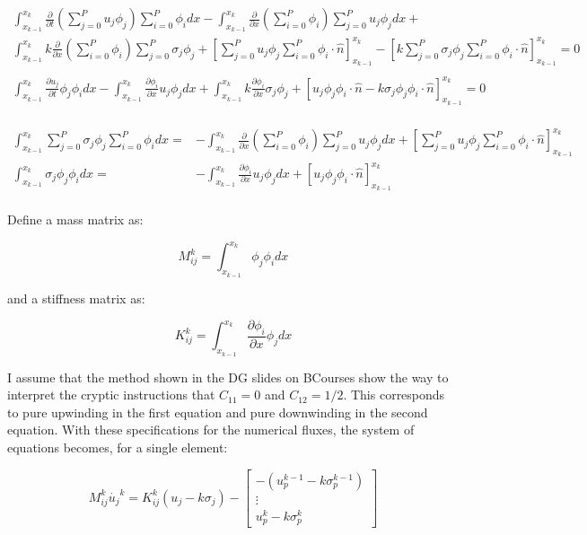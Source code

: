 \documentclass[10pt]{article}
\newcommand{\beq}{\begin{equation}}
\newcommand{\eeq}{\end{equation}}
\newcommand{\beqa}{\begin{equation}\begin{aligned}}
\newcommand{\eeqa}{\end{aligned}\end{equation}}
\begin{document}
\beqa
\int_{x_{k-1}}^{x_k}\frac{\partial}{\partial t}\left(\sum_{j=0}^{P}u_j\phi_j\right)\sum_{i=0}^{P}\phi_idx-\int_{x_{k-1}}^{x_k}\frac{\partial}{\partial x}\left(\sum_{i=0}^{P}\phi_i\right)\sum_{j=0}^{P}u_j\phi_jdx+\quad\\
\int_{x_{k-1}}^{x_k}k\frac{\partial}{\partial x}\left(\sum_{i=0}^{P}\phi_i\right)\sum_{j=0}^{P}\sigma_j\phi_j+\left\lbrack \sum_{j=0}^{P}u_j\phi_j\sum_{i=0}^{P}\phi_i\cdot\hat{n}\right\rbrack_{x_{k-1}}^{x_k}-\left\lbrack k\sum_{j=0}^{P}\sigma_j\phi_j\sum_{i=0}^{P}\phi_i\cdot\hat{n}\right\rbrack_{x_{k-1}}^{x_k}=0\\
\\
\int_{x_{k-1}}^{x_k}\frac{\partial u_j}{\partial t}\phi_j\phi_idx-\int_{x_{k-1}}^{x_k}\frac{\partial\phi_i}{\partial x}u_j\phi_jdx+\int_{x_{k-1}}^{x_k}k\frac{\partial\phi_i}{\partial x}\sigma_j\phi_j+\left\lbrack u_j\phi_j\phi_i\cdot\hat{n}-k\sigma_j\phi_j\phi_i\cdot\hat{n}\right\rbrack_{x_{k-1}}^{x_k}=0\\
\eeqa

\beqa
\int_{x_{k-1}}^{x_k}\sum_{j=0}^{P}\sigma_j\phi_j\sum_{i=0}^{P}\phi_idx=&-\int_{x_{k-1}}^{x_k}\frac{\partial}{\partial x}\left(\sum_{i=0}^{P}\phi_i\right)\sum_{j=0}^{P}u_j\phi_jdx+\left\lbrack \sum_{j=0}^{P}u_j\phi_j\sum_{i=0}^{P}\phi_i\cdot\hat{n}\right\rbrack_{x_{k-1}}^{x_k}\\
\int_{x_{k-1}}^{x_k}\sigma_j\phi_j\phi_idx=&-\int_{x_{k-1}}^{x_k}\frac{\partial\phi_i}{\partial x}u_j\phi_jdx+\left\lbrack u_j\phi_j\phi_i\cdot\hat{n}\right\rbrack_{x_{k-1}}^{x_k}\\
\eeqa

Define a mass matrix as:

\beq
M_{ij}^k=\int_{x_{k-1}}^{x_k}\phi_j\phi_idx
\eeq

and a stiffness matrix as:

\beq
K_{ij}^k=\int_{x_{k-1}}^{x_k}\frac{\partial\phi_i}{\partial x}\phi_jdx
\eeq

I assume that the method shown in the DG slides on BCourses show the way to interpret the cryptic instructions that \(C_{11}=0\) and \(C_{12}=1/2\). This corresponds to pure upwinding in the first equation and pure downwinding in the second equation. With these specifications for the numerical fluxes, the system of equations becomes, for a single element:

\beq
\label{eq:u}
M_{ij}^k\dot{u_j}^k=K_{ij}^k\left(u_j-k\sigma_j\right)-\begin{bmatrix}-(u_p^{k-1}-k\sigma_p^{k-1})\\\vdots\\u_p^k-k\sigma_p^k\end{bmatrix}
\eeq
\end{document}
